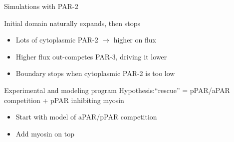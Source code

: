 \documentclass{beamer}
\newcommand{\6}[1]{#1_{\text{6}}}
\newcommand{\3}[1]{#1_{\text{3}}}
\begin{document}
\begin{frame}{Simulations with PAR-2}
\begin{center}
\end{center}
Initial domain naturally expands, then stops 
\begin{itemize}
\item Lots of cytoplasmic PAR-2 $\rightarrow$ higher on flux
\item Higher flux out-competes PAR-3, driving it lower
\item Boundary stops when cytoplasmic PAR-2 is too low
\end{itemize}
\end{frame}

\begin{frame}{Experimental and modeling program}
Hypothesis:``rescue'' = pPAR/aPAR competition + pPAR inhibiting myosin 
\begin{itemize}
\item Start with model of aPAR/pPAR competition
\item Add myosin on top
\end{itemize}
\end{frame}
\end{document}
